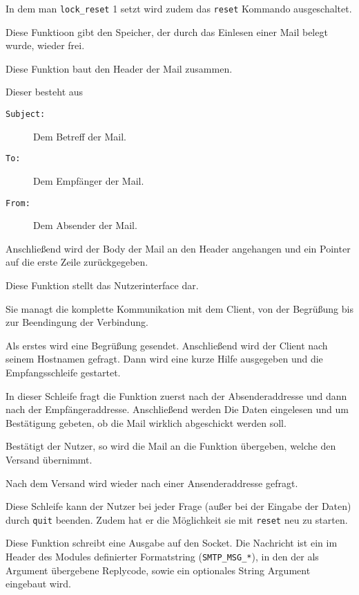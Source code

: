In dem man \texttt{lock\_reset} 1 setzt wird zudem das \texttt{reset} Kommando ausgeschaltet.

\label{fn:user_clean_mail_data}
Diese Funktioon gibt den Speicher, der durch das Einlesen einer Mail belegt wurde, wieder frei.

\label{user_build_header}
Diese Funktion baut den Header der Mail zusammen.

Dieser besteht aus 
\begin{description}
  \item[\texttt{Subject:}] Dem Betreff der Mail.
  \item[\texttt{To:}] Dem Empf\"{a}nger der Mail.
  \item[\texttt{From:}] Dem Absender der Mail.
\end{description}

Anschließend wird der Body der Mail an den Header angehangen und ein Pointer auf die erste Zeile zur\"{u}ckgegeben.

\label{fn:user_start_session}
Diese Funktion stellt das Nutzerinterface dar.

Sie managt die komplette Kommunikation mit dem Client, von der Begr\"{u}ßung bis zur Beendingung der Verbindung.

Als erstes wird eine Begr\"{u}ßung gesendet. Anschließend wird der Client nach seinem Hostnamen gefragt. Dann wird eine kurze Hilfe ausgegeben und die Empfangsschleife gestartet.

In dieser Schleife fragt die Funktion zuerst nach der Absenderaddresse und dann nach der Empf\"{a}ngeraddresse. Anschließend werden Die Daten eingelesen und um Best\"{a}tigung gebeten, ob die Mail wirklich abgeschickt werden soll.

Best\"{a}tigt der Nutzer, so wird die Mail an die Funktion  \"{u}bergeben, welche den Versand \"{u}bernimmt.

Nach dem Versand wird wieder nach einer Ansenderaddresse gefragt.

Diese Schleife kann der Nutzer bei jeder Frage (außer bei der Eingabe der Daten) durch \texttt{quit} beenden. Zudem hat er die M\"{o}glichkeit sie mit \texttt{reset} neu zu starten. 



\label{fn:smtp_write_client_msg}
Diese Funktion schreibt eine Ausgabe auf den Socket. Die Nachricht ist ein im Header des Modules  definierter Formatstring (\texttt{SMTP\_MSG\_*}), in den der als Argument \"{u}bergebene Replycode, sowie ein optionales String Argument eingebaut wird.

